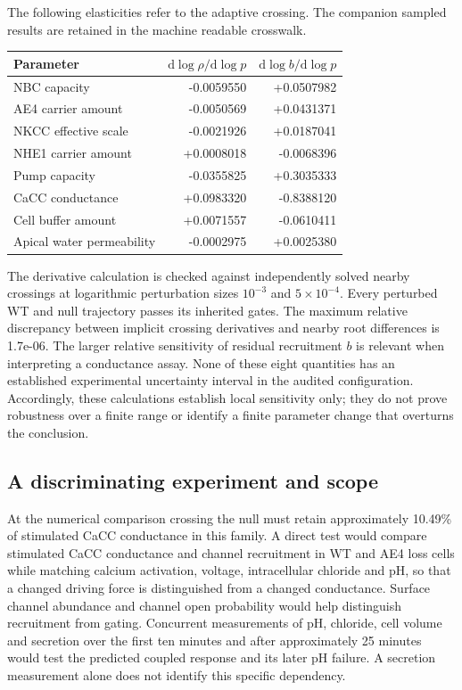 The following elasticities refer to the adaptive crossing. The companion
sampled results are retained in the machine readable crosswalk.
\begin{center}
\begin{tabular}{lrr}
\hline
Parameter & $\mathrm d\log\rho/\mathrm d\log p$ & $\mathrm d\log b/\mathrm d\log p$ \\
\hline
NBC capacity & -0.0059550 & +0.0507982 \\
AE4 carrier amount & -0.0050569 & +0.0431371 \\
NKCC effective scale & -0.0021926 & +0.0187041 \\
NHE1 carrier amount & +0.0008018 & -0.0068396 \\
Pump capacity & -0.0355825 & +0.3035333 \\
CaCC conductance & +0.0983320 & -0.8388120 \\
Cell buffer amount & +0.0071557 & -0.0610411 \\
Apical water permeability & -0.0002975 & +0.0025380 \\
\hline
\end{tabular}
\end{center}
The derivative calculation is checked against independently solved nearby
crossings at logarithmic perturbation sizes $10^{-3}$ and $5\times10^{-4}$.
Every perturbed WT and null trajectory passes its inherited gates. The maximum
relative discrepancy between implicit crossing derivatives and nearby root
differences is 1.7e-06.
The larger relative sensitivity of residual recruitment $b$ is relevant when
interpreting a conductance assay. None of these eight quantities has an
established experimental uncertainty interval in the audited configuration.
Accordingly, these calculations establish local sensitivity only; they do
not prove robustness over a finite range or identify a finite parameter
change that overturns the conclusion.

\subsection{A discriminating experiment and scope}
At the numerical comparison crossing the null must retain approximately
10.49\% of stimulated CaCC conductance in this family. A direct test would
compare stimulated CaCC conductance and channel recruitment in WT and AE4
loss cells while matching calcium activation, voltage, intracellular chloride
and pH, so that a changed driving force is distinguished from a changed
conductance. Surface channel abundance and channel open probability would
help distinguish recruitment from gating. Concurrent measurements of pH,
chloride, cell volume and secretion over the first ten minutes and after
approximately 25 minutes would test the predicted coupled response and its
later pH failure. A secretion measurement alone does not identify this
specific dependency.
